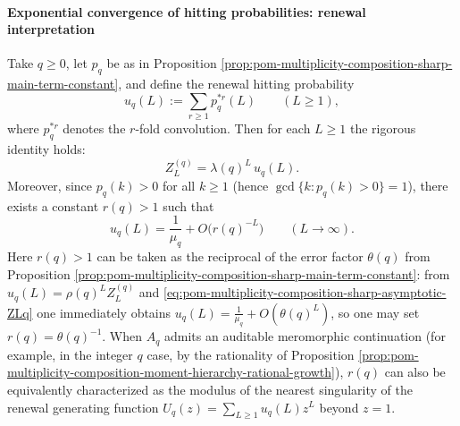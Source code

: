 \paragraph{Exponential convergence of hitting probabilities: renewal interpretation}
\begin{proposition}\label{prop:pom-multiplicity-composition-renewal-hit-prob}
Take \(q\ge 0\), let \(p_q\) be as in Proposition \ref{prop:pom-multiplicity-composition-sharp-main-term-constant}, and define the renewal hitting probability
\[
u_q(L):=\sum_{r\ge 1}p_q^{*r}(L)\qquad(L\ge 1),
\]
where \(p_q^{*r}\) denotes the \(r\)-fold convolution.
Then for each \(L\ge 1\) the rigorous identity holds:
\begin{equation}\label{eq:pom-multiplicity-composition-ZLq-renewal-factor}
\boxed{\;
Z_L^{(q)}=\lambda(q)^{L}\,u_q(L).\;}
\end{equation}
Moreover, since \(p_q(k)>0\) for all \(k\ge 1\) (hence \(\gcd\{k:p_q(k)>0\}=1\)), there exists a constant \(r(q)>1\) such that
\begin{equation}\label{eq:pom-multiplicity-composition-renewal-exp-conv}
\boxed{\;
u_q(L)=\frac{1}{\mu_q}+O\!\bigl(r(q)^{-L}\bigr)\qquad(L\to\infty).\;}
\end{equation}
Here \(r(q)>1\) can be taken as the reciprocal of the error factor \(\theta(q)\) from Proposition \ref{prop:pom-multiplicity-composition-sharp-main-term-constant}:
from \(u_q(L)=\rho(q)^L Z_L^{(q)}\) and \eqref{eq:pom-multiplicity-composition-sharp-asymptotic-ZLq} one immediately obtains
\(
u_q(L)=\frac{1}{\mu_q}+O(\theta(q)^L)
\),
so one may set
\(
r(q)=\theta(q)^{-1}
\).
When \(A_q\) admits an auditable meromorphic continuation (for example, in the integer \(q\) case, by the rationality of Proposition \ref{prop:pom-multiplicity-composition-moment-hierarchy-rational-growth}),
\(r(q)\) can also be equivalently characterized as the modulus of the nearest singularity of the renewal generating function
\(
U_q(z)=\sum_{L\ge 1}u_q(L)z^L
\)
beyond \(z=1\).
\end{proposition}
